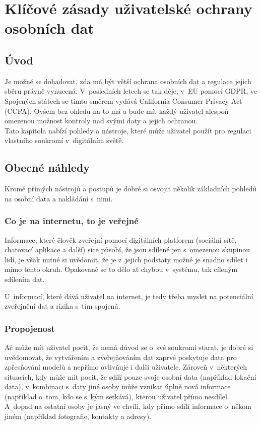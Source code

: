 \chapter{Klíčové zásady uživatelské ochrany osobních dat}

\section*{Úvod}
Je možné se dohadovat, zda má být větší ochrana osobních dat a regulace jejich sběru právně vynucená. V~posledních letech se tak děje, v~EU pomocí GDPR, ve Spojených státech se tímto směrem vydává California Consumer Privacy Act (CCPA).
Ovšem bez ohledu na to má a bude mít každý uživatel alespoň omezenou možnost kontroly nad svými daty a jejich ochranou.\\
Tato kapitola nabízí pohledy a nástroje, které může uživatel použít pro regulaci vlastního soukromí v~digitálním světě.

\section{Obecné náhledy}
Kromě přímých nástrojů a postupů je dobré si osvojit několik základních pohledů na osobní data a nakládání s~nimi.

\subsection{Co je na internetu, to je veřejné}
Informace, které člověk zveřejní pomocí digitálních platforem (sociální sítě, chatovací aplikace a další) sice působí, že jsou sdílené jen s~omezenou skupinou lidí, je však nutné si uvědomit, že je z~jejich podstaty možné je snadno sdílet i mimo tento okruh. Opakovaně se to dělo ať chybou v~systému, tak cíleným sdílením dat.

U~informací, které dává uživatel na internet, je tedy třeba myslet na potenciální zveřejnění dat a rizika s~tím spojená.


\subsection{Propojenost}
Ač může mít uživatel pocit, že nemá důvod se o~své soukromí starat, je dobré si uvědomovat, že vytvářením a zveřejňováním dat zaprvé poskytuje data pro zpřesňování modelů a nepřímo ovlivňuje i další uživatele. Zároveň v~některých situacích, kdy může mít pocit, že sdílí pouze svoje osobní data (například lokační data), v~kombinaci s~daty jiné osoby může vznikat úplně nová informace (například o~tom, kdo se s~kým setkává), kterou uživatel přímo nesdílel. A~dopad na ostatní osoby je jasný ve chvíli, kdy přímo sdílí informace o~někom jiném (například fotografie, kontakty a adresy).  

